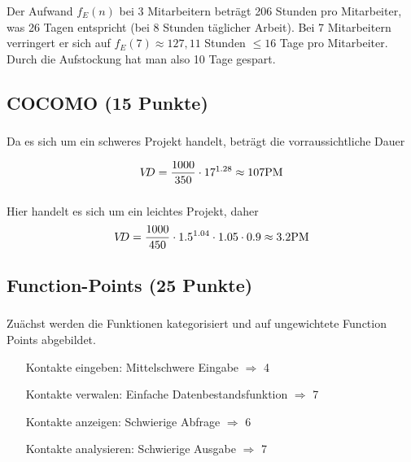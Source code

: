 \documentclass{scrartcl}
\begin{document}
Der Aufwand $f_E(n)$ bei 3 Mitarbeitern beträgt 206 Stunden pro Mitarbeiter, was
26 Tagen entspricht (bei 8 Stunden täglicher Arbeit).
Bei 7 Mitarbeitern verringert er sich auf $f_E(7)\approx 127,11$ Stunden $\le
16$ Tage pro Mitarbeiter. Durch die Aufstockung hat man also 10 Tage gespart.

\subsection{COCOMO (15 Punkte)}

\subsubsection{}

Da es sich um ein schweres Projekt handelt, beträgt die vorraussichtliche Dauer

\begin{equation*}
   V\kern-3ptD = \frac{1000}{350} \cdot 17^{1.28} \approx 107 \text{PM}
\end{equation*}

\subsubsection{}

Hier handelt es sich um ein leichtes Projekt, daher
\begin{equation*}
   V\kern-3ptD = \frac{1000}{450} \cdot 1.5^{1.04} \cdot 1.05 \cdot 0.9 \approx 3.2 \text{PM}
\end{equation*}

\subsection{Function-Points (25 Punkte)}

\subsubsection{}
Zuächst werden die Funktionen kategorisiert und auf ungewichtete Function Points
abgebildet.

\begin{itemize}[font=\textbf,align=left]
   \item[Kontakte eingeben:] Mittelschwere Eingabe $\Rightarrow$ 4
   \item[Kontakte verwalen:] Einfache Datenbestandsfunktion $\Rightarrow$ 7
   \item[Kontakte anzeigen:] Schwierige Abfrage $\Rightarrow$ 6
   \item[Kontakte analysieren:] Schwierige Ausgabe $\Rightarrow$ 7
\end{itemize}
\end{document}
